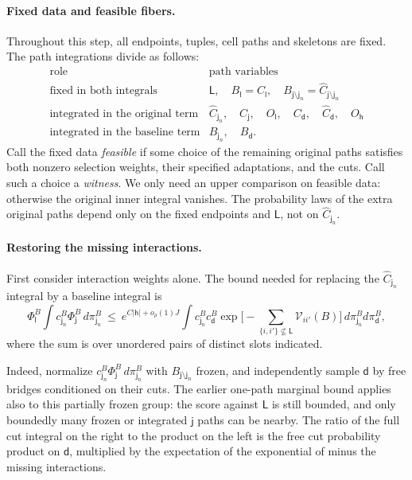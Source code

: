 \paragraph{Fixed data and feasible fibers.}
Throughout this step, all endpoints, tuples, cell paths and skeletons
are fixed. The path integrations divide as follows:
\[
\begin{array}{c|l}
 \text{role}&\text{path variables}\\ \hline
 \text{fixed in both integrals}
   &\mathsf L,\quad B_{\mathsf l}=C_{\mathsf l},\quad
             B_{\mathsf j\setminus\mathsf j_n}
                       =\widehat C_{\mathsf j\setminus\mathsf j_n}\\
 \text{integrated in the original term}
   &\widehat C_{\mathsf j_n},\quad C_{\mathsf j},\quad O_{\mathsf l},
      \quad C_{\mathsf d},\quad\widehat C_{\mathsf d},\quad O_{\mathsf h}\\
 \text{integrated in the baseline term}&B_{\mathsf j_n},\quad B_{\mathsf d}.
\end{array}
\]
Call the fixed data \emph{feasible} if some choice of the remaining
original paths satisfies both nonzero selection weights, their specified
adaptations, and the cuts. Call such a choice a \emph{witness}. We only
need an upper comparison on feasible data: otherwise the original inner
integral vanishes. The probability laws of the extra original paths
depend only on the fixed endpoints and $\mathsf L$, not on
$\widehat C_{\mathsf j_n}$.

\paragraph{Restoring the missing interactions.}
First consider interaction weights alone. The bound needed for replacing
the $\widehat C_{\mathsf j_n}$ integral by a baseline integral is
\begin{equation}
 \Phi_{\mathsf l}^B
      \int c_{\mathsf j_n}^B\Phi_{\mathsf j}^B\,d\pi_{\mathsf j_n}^B
 \ \le\ e^{C|\mathsf h|+o_\rho(1)J}
      \int c_{\mathsf j_n}^B c_{\mathsf d}^B
       \exp\!\Big[-\sum_{\{i,i'\}\not\subseteq\mathsf L}
                          \mathcal V_{ii'}(B)\Big]\,
                       d\pi_{\mathsf j_n}^B d\pi_{\mathsf d}^B ,
\tag{29a}\label{eq:restoring-weights}
\end{equation}
where the sum is over unordered pairs of distinct slots indicated. 

Indeed, normalize
$c_{\mathsf j_n}^B\Phi_{\mathsf j}^B\,d\pi_{\mathsf j_n}^B$ with
$B_{\mathsf j\setminus\mathsf j_n}$ frozen, and independently sample
$\mathsf d$ by free bridges conditioned on their cuts. The earlier
one-path marginal bound applies also to this partially frozen group:
the score against $\mathsf L$ is still bounded, and only boundedly many
frozen or integrated $\mathsf j$ paths can be nearby. The ratio of the
full cut integral on the right to the product on the left is the free
cut probability product on $\mathsf d$, multiplied by the expectation
of the exponential of minus the missing interactions.

